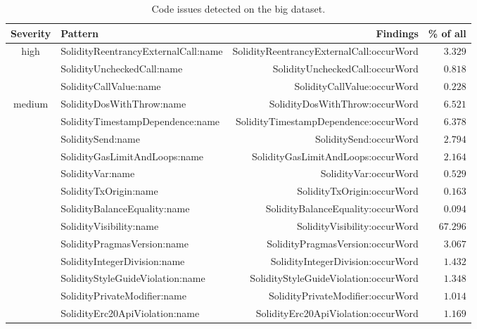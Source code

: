 \let\letcs\texapiletcs
\begin{table}[t]
	\centering
	\caption{Code issues detected on the big dataset.}
	\begin{tabular}{|c|l|r|r|}
		\hline
		\textbf{Severity} & \textbf{Pattern} & \textbf{Findings} & \textbf{\% of all} \\
		\hline
		\multirow{3}{*}{high} & {\usevalue SolidityReentrancyExternalCall:name } & {\usevalue SolidityReentrancyExternalCall:occurWord } & $3.329$ \\
		 & {\usevalue SolidityUncheckedCall:name } & {\usevalue SolidityUncheckedCall:occurWord } & $0.818$ \\
		 & {\usevalue SolidityCallValue:name } & {\usevalue SolidityCallValue:occurWord } & $0.228$ \\
		\hline
		\multirow{8}{*}{medium} & {\usevalue SolidityDosWithThrow:name } & {\usevalue SolidityDosWithThrow:occurWord } & $6.521$ \\
		& {\usevalue SolidityTimestampDependence:name } & {\usevalue SolidityTimestampDependence:occurWord } & $6.378$ \\
		& {\usevalue SoliditySend:name } & {\usevalue SoliditySend:occurWord } & $2.794$ \\
		& {\usevalue SolidityGasLimitAndLoops:name } & {\usevalue SolidityGasLimitAndLoops:occurWord } & $2.164$ \\
		& {\usevalue SolidityVar:name } & {\usevalue SolidityVar:occurWord } & $0.529$ \\
		& {\usevalue SolidityTxOrigin:name } & {\usevalue SolidityTxOrigin:occurWord } & $0.163$ \\
		& {\usevalue SolidityBalanceEquality:name } & {\usevalue SolidityBalanceEquality:occurWord } & $0.094$ \\
		\hline
		\multirow{10}{*}{low} & {\usevalue SolidityVisibility:name } & {\usevalue SolidityVisibility:occurWord } & $67.296$ \\& {\usevalue SolidityPragmasVersion:name } & {\usevalue SolidityPragmasVersion:occurWord } & $3.067$ \\
		& {\usevalue SolidityIntegerDivision:name } & {\usevalue SolidityIntegerDivision:occurWord } & $1.432$ \\
		& {\usevalue SolidityStyleGuideViolation:name } & {\usevalue SolidityStyleGuideViolation:occurWord } & $1.348$ \\
		& {\usevalue SolidityPrivateModifier:name } & {\usevalue SolidityPrivateModifier:occurWord } & $1.014$ \\
		& {\usevalue SolidityErc20ApiViolation:name } & {\usevalue SolidityErc20ApiViolation:occurWord } & $1.169$ \\

\end{tabular}
\end{table}
